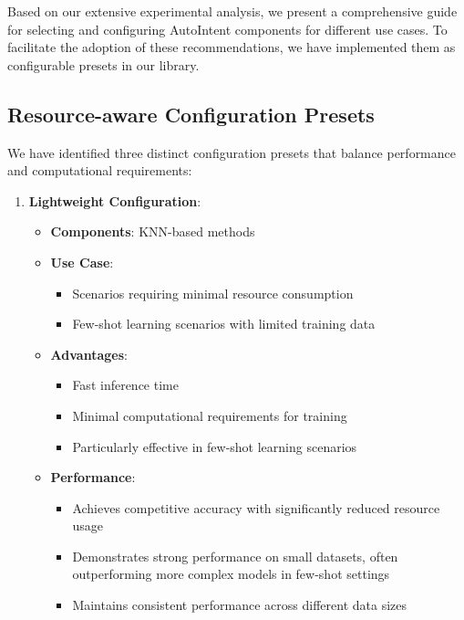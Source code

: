 Based on our extensive experimental analysis, we present a comprehensive guide for selecting and configuring AutoIntent components for different use cases. To facilitate the adoption of these recommendations, we have implemented them as configurable presets in our library.

\subsection{Resource-aware Configuration Presets}

We have identified three distinct configuration presets that balance performance and computational requirements:

\begin{enumerate}
    \item \textbf{Lightweight Configuration}:
    \begin{itemize}
        \item \textbf{Components}: KNN-based methods
        \item \textbf{Use Case}: 
        \begin{itemize}
            \item Scenarios requiring minimal resource consumption
            \item Few-shot learning scenarios with limited training data
        \end{itemize}
        \item \textbf{Advantages}:
        \begin{itemize}
            \item Fast inference time
            \item Minimal computational requirements for training
            \item Particularly effective in few-shot learning scenarios
        \end{itemize}
        \item \textbf{Performance}: 
        \begin{itemize}
            \item Achieves competitive accuracy with significantly reduced resource usage
            \item Demonstrates strong performance on small datasets, often outperforming more complex models in few-shot settings
            \item Maintains consistent performance across different data sizes
        \end{itemize}
    \end{itemize}
    

\end{enumerate}
